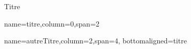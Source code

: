 \begin{poster}{}
	{}{Titre}
	{}{}

	{name=titre,column=0,span=2}{
		\lipsum[1]
	}

	{name=autreTitre,column=2,span=4, bottomaligned=titre}{
		\lipsum[1-2]
	}
	
\end{poster}
